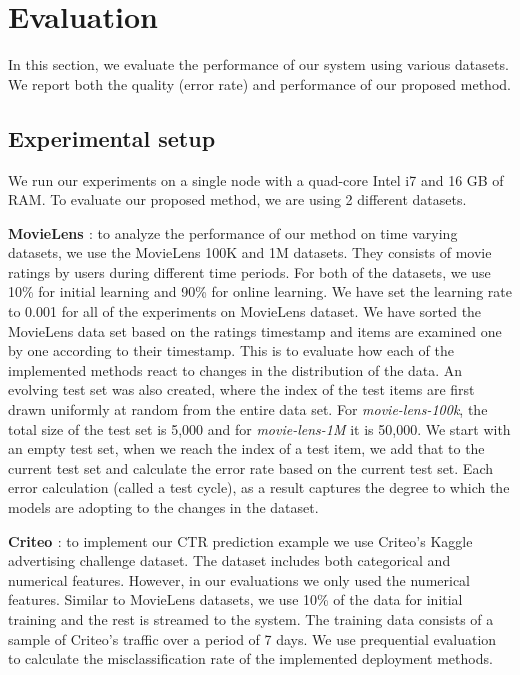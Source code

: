 \documentclass{vldb}
\begin{document}
\section{Evaluation} \label{evaluation} 
In this section, we evaluate the performance of our system using various datasets. 
We report both the quality (error rate) and performance of our proposed method. 

\subsection{Experimental setup}
We run our experiments on a single node with a quad-core Intel i7 and 16 GB of RAM. 
To evaluate our proposed method, we are using 2 different datasets.

\textbf{MovieLens \cite{harper2016movielens}}: to analyze the performance of our method on time varying datasets, we use the MovieLens 100K and 1M datasets. 
They consists of movie ratings by users during different time periods. 
For both of the datasets, we use 10\% for initial learning and 90\% for online learning. 
We have set the learning rate to 0.001 for all of the experiments on MovieLens dataset.
We have sorted the MovieLens data set based on the ratings timestamp and items are examined one by one according to their timestamp.
This is to evaluate how each of the implemented methods react to changes in the distribution of the data.
An evolving test set was also created, where the index of the test items are first drawn uniformly at random from the entire data set.
For \textit{movie-lens-100k}, the total size of the test set is 5,000 and for \textit{movie-lens-1M} it is 50,000.
We start with an empty test set, when we reach the index of a test item, we add that to the current test set and calculate the error rate based on the current test set.
Each error calculation (called a test cycle), as a result captures the degree to which the models are adopting to the changes in the dataset.

\textbf{Criteo \cite{criteo-kaggle}}: to implement our CTR prediction example we use Criteo's Kaggle advertising challenge dataset.
The dataset includes both categorical and numerical features.
However, in our evaluations we only used the numerical features.
Similar to MovieLens datasets, we use 10\% of the data for initial training and the rest is streamed to the system.
The training data consists of a sample of Criteo's traffic over a period of 7 days.
We use prequential evaluation \cite{gama2009issues} to calculate the misclassification rate of the implemented deployment methods.
\end{document}
